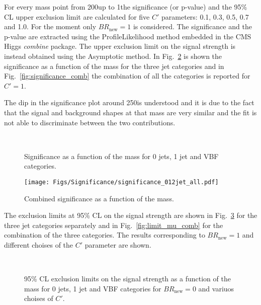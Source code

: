 \begin{table}[h!]
\begin{center}
{\begin{tabular}{
c | c | c | c }
\hline
\end{tabular}
}
\end{center}

\end{table}


For every mass point from 200\GeV up to 1\TeV the significance (or p-value) and the 95\% CL upper exclusion limit are calculated for five $C'$ parameters: 0.1, 0.3, 0.5, 0.7 and 1.0. For the moment only $BR_\mathrm{new} = 1$ is considered.
The significance and the p-value are extracted using the ProfileLikelihood method embedded in the CMS Higgs \textit{combine} package. The upper exclusion limit on the signal strength is instead obtained using the Asymptotic method.
In Fig.~\ref{fig:significance} is shown the significance as a function of the mass for the three jet categories and in Fig.~\ref{fig:significance_comb} the combination of all the categories is reported for $C' = 1$.

The dip in the significance plot around 250\GeV is understood and it is due to the fact that the signal and background shapes at that mass are very similar and the fit is not able to discriminate between the two contributions.

\begin{figure}[htb]
\centering
{}
\\
\caption{
    Significance as a function of the mass for 0 jets, 1 jet and VBF categories.}
    \label{fig:significance}
\end{figure}

\begin{figure}[htb]
\centering
\texttt{[image: Figs/Significance/significance\_012jet\_all.pdf]}
\caption{
    Combined significance as a function of the mass.}
    \label{fig:significance}
\end{figure}

The exclusion limits at 95\% CL on the signal strength are shown in Fig.~\ref{fig:limit_mu} for the three jet categories separately and in Fig.~\ref{fig:limit_mu_comb} for the combination of the three categories. The results corresponding to $BR_\mathrm{new} = 1$ and different choises of the $C'$ parameter are shown.

\begin{figure}[htb]
\centering
{}
\\
\caption{
    95\% CL exclusion limits on the signal strength as a function of the mass for 0 jets, 1 jet and VBF categories for $BR_\mathrm{new}=0$ and variuos choises of $C'$.}
    \label{fig:limit_mu}
\end{figure}

